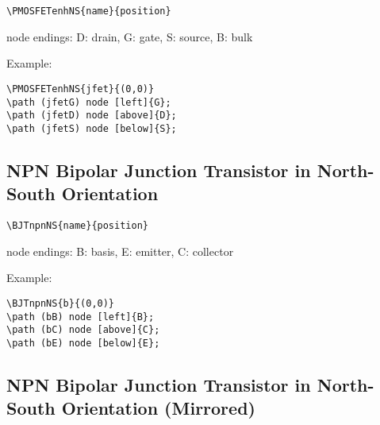 \documentclass[parskip=full]{scrartcl}
\begin{document}
\begin{verbatim}
\PMOSFETenhNS{name}{position}
\end{verbatim}
node endings: D: drain, G: gate, S: source, B: bulk

Example:\\
\begin{minipage}{0.8\textwidth}
\begin{verbatim}
\PMOSFETenhNS{jfet}{(0,0)}
\path (jfetG) node [left]{G};
\path (jfetD) node [above]{D};
\path (jfetS) node [below]{S};
\end{verbatim}
\end{minipage}
\begin{minipage}{0.19\textwidth}
\end{minipage}

\subsection{NPN Bipolar Junction Transistor in North-South Orientation}

\begin{verbatim}
\BJTnpnNS{name}{position}
\end{verbatim}
node endings: B: basis, E: emitter, C: collector

Example:\\
\begin{minipage}{0.8\textwidth}
\begin{verbatim}
\BJTnpnNS{b}{(0,0)}
\path (bB) node [left]{B};
\path (bC) node [above]{C};
\path (bE) node [below]{E};
\end{verbatim}
\end{minipage}
\begin{minipage}{0.19\textwidth}
\end{minipage}

\subsection{NPN Bipolar Junction Transistor in North-South Orientation (Mirrored)}
\end{document}
